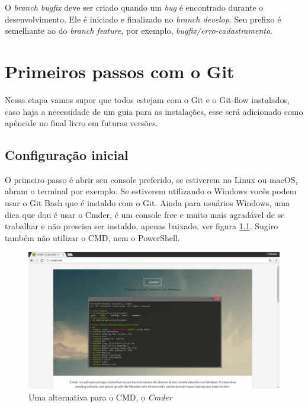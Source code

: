 \documentclass[12pt,openright,oneside,a4paper,english,brazil]{abntex2}
\begin{document}
O \textit{branch bugfix} deve ser criado quando um \textit{bug} é encontrado durante o desenvolvimento. Ele é iniciado e finalizado no \textit{branch develop}. Seu prefixo é semelhante ao do \textit{branch feature}, por exemplo, \textit{bugfix/erro-cadastramento}.

\chapter{Primeiros passos com o Git}

Nessa etapa vamos supor que todos estejam com o Git e o Git-flow instalados, caso haja a necessidade de um guia para as instalações, esse será adicionado como apêncide no final livro em futuras versões.

\section{Configuração inicial \label{configinicial}}

O primeiro passo é abrir seu console preferido, se estiverem no Linux ou macOS, abram o terminal por exemplo. Se estiverem utilizando o Windows vocês podem usar o Git Bash que é instaldo com o Git. Ainda para usuários Windows, uma dica que dou é usar o Cmder, é um console free e muito mais agradável de se trabalhar e não prescisa ser instaldo, apenas baixado, ver figura \ref{cmder}. Sugiro também não utilizar o CMD, nem o PowerShell.

\begin{figure}[h]
	\caption{\label{cmder}Uma alternativa para o CMD, o \textit{Cmder}}
	\begin{center}
		\includegraphics[width=1\linewidth]{imagens/cmder}
	\end{center}
\end{figure}
\end{document}
